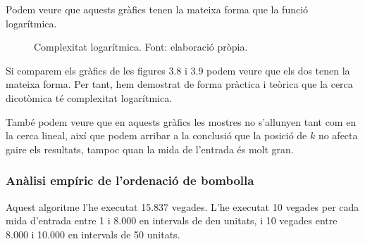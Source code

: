 Podem veure que aquests gràfics tenen la mateixa forma que la funció logarítmica.

\begin{figure}[H]
    \centering
    \caption[Complexitat logarítmica.]{Complexitat logarítmica. Font: elaboració pròpia.}
    \label{fig:my_label}
\end{figure}

Si comparem els gràfics de les figures 3.8 i 3.9 podem veure que els dos tenen la mateixa forma. Per tant, hem demostrat de forma pràctica i teòrica que la cerca dicotòmica té complexitat logarítmica.

També podem veure que en aquests gràfics les mostres no s'allunyen tant com en la cerca lineal, així que podem arribar a la conclusió que la posició de $k$ no afecta gaire els resultats, tampoc quan la mida de l'entrada és molt gran.

\subsubsection{Anàlisi empíric de l'ordenació de bombolla}
Aquest algoritme l'he executat 15.837 vegades. L'he executat 10 vegades per cada mida d'entrada entre 1 i 8.000 en intervals de deu unitats, i 10 vegades entre 8.000 i 10.000 en intervals de 50 unitats.

